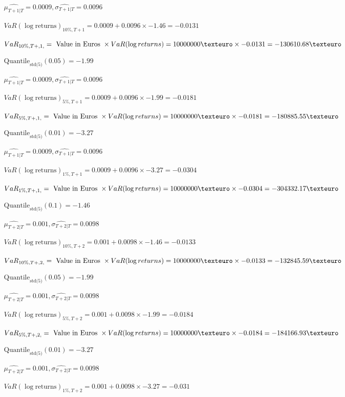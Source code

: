 $\hat{\mu_{T+1|T}} = 0.0009, \hat{\sigma_{T+1|T}} = 0.0096$

$VaR(\log \text{returns})_{10\%, T + 1} = 0.0009 + 0.0096\times-1.46 = -0.0131$

$VaR_{10\%, T + ,1,} = \text{ Value in Euros } \times VaR(\log returns) = 10 000 000 \texteuro \times-0.0131 = -130610.68 \texteuro$


$\text{Quantile}_\text{std(5)}(0.05) = -1.99$

$\hat{\mu_{T+1|T}} = 0.0009, \hat{\sigma_{T+1|T}} = 0.0096$

$VaR(\log \text{returns})_{5\%, T + 1} = 0.0009 + 0.0096\times-1.99 = -0.0181$

$VaR_{5\%, T + ,1,} = \text{ Value in Euros } \times VaR(\log returns) = 10 000 000 \texteuro \times-0.0181 = -180885.55 \texteuro$


$\text{Quantile}_\text{std(5)}(0.01) = -3.27$

$\hat{\mu_{T+1|T}} = 0.0009, \hat{\sigma_{T+1|T}} = 0.0096$

$VaR(\log \text{returns})_{1\%, T + 1} = 0.0009 + 0.0096\times-3.27 = -0.0304$

$VaR_{1\%, T + ,1,} = \text{ Value in Euros } \times VaR(\log returns) = 10 000 000 \texteuro \times-0.0304 = -304332.17 \texteuro$


$\text{Quantile}_\text{std(5)}(0.1) = -1.46$

$\hat{\mu_{T+2|T}} = 0.001, \hat{\sigma_{T+2|T}} = 0.0098$

$VaR(\log \text{returns})_{10\%, T + 2} = 0.001 + 0.0098\times-1.46 = -0.0133$

$VaR_{10\%, T + ,2,} = \text{ Value in Euros } \times VaR(\log returns) = 10 000 000 \texteuro \times-0.0133 = -132845.59 \texteuro$


$\text{Quantile}_\text{std(5)}(0.05) = -1.99$

$\hat{\mu_{T+2|T}} = 0.001, \hat{\sigma_{T+2|T}} = 0.0098$

$VaR(\log \text{returns})_{5\%, T + 2} = 0.001 + 0.0098\times-1.99 = -0.0184$

$VaR_{5\%, T + ,2,} = \text{ Value in Euros } \times VaR(\log returns) = 10 000 000 \texteuro \times-0.0184 = -184166.93 \texteuro$


$\text{Quantile}_\text{std(5)}(0.01) = -3.27$

$\hat{\mu_{T+2|T}} = 0.001, \hat{\sigma_{T+2|T}} = 0.0098$

$VaR(\log \text{returns})_{1\%, T + 2} = 0.001 + 0.0098\times-3.27 = -0.031$

